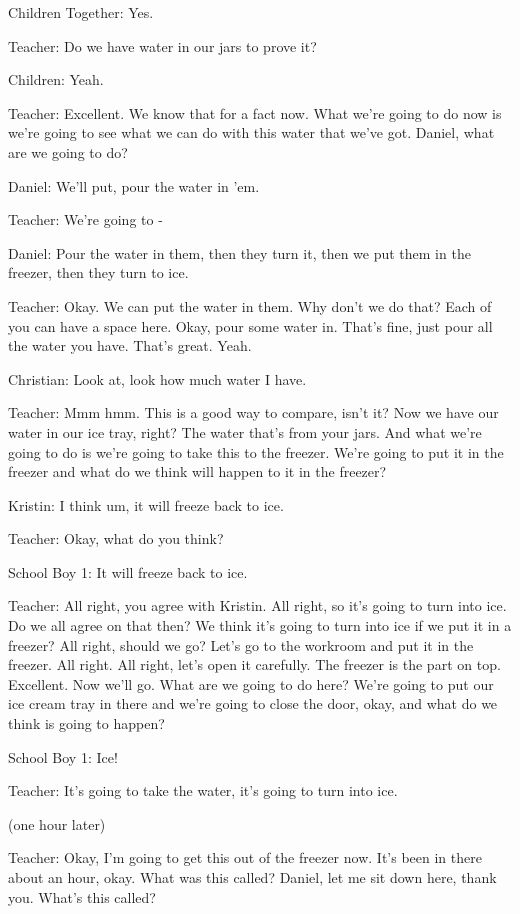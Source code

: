Children Together: Yes.

Teacher: Do we have water in our jars to prove it?

Children: Yeah.

Teacher: Excellent. We know that for a fact now. What we're going to do now is we're going to see what we can do with this water that we've got. Daniel, what are we going to do?

Daniel: We'll put, pour the water in 'em.

Teacher: We're going to -

Daniel: Pour the water in them, then they turn it, then we put them in the freezer, then they turn to ice.

Teacher: Okay. We can put the water in them. Why don't we do that? Each of you can have a space here. Okay, pour some water in. That's fine, just pour all the water you have. That's great. Yeah.

Christian: Look at, look how much water I have.

Teacher: Mmm hmm. This is a good way to compare, isn't it? Now we have our water in our ice tray, right? The water that's from your jars. And what we're going to do is we're going to take this to the freezer. We're going to put it in the freezer and what do we think will happen to it in the freezer?

Kristin: I think um, it will freeze back to ice.

Teacher: Okay, what do you think?

School Boy 1: It will freeze back to ice.

Teacher: All right, you agree with Kristin. All right, so it's going to turn into ice. Do we all agree on that then? We think it's going to turn into ice if we put it in a freezer? All right, should we go? Let's go to the workroom and put it in the freezer. All right. All right, let's open it carefully. The freezer is the part on top. Excellent. Now we'll go. What are we going to do here? We're going to put our ice cream tray in there and we're going to close the door, okay, and what do we think is going to happen?

School Boy 1: Ice!

Teacher: It's going to take the water, it's going to turn into ice.

(one hour later)

Teacher: Okay, I'm going to get this out of the freezer now. It's been in there about an hour, okay. What was this called? Daniel, let me sit down here, thank you. What's this called?

